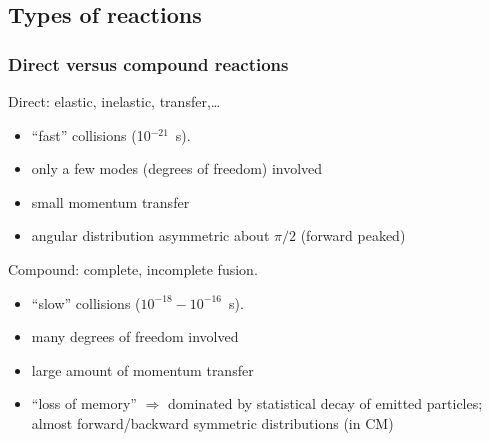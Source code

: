 \documentclass[english,10pt]{beamer}
\newcommand{\slide}[1]{\begin{frame} \frametitle{ #1}}
\begin{document}
\subsection{Types of reactions}

\slide{Direct versus compound reactions}

{\sc \brick Direct:} elastic, inelastic, transfer,\ldots
\begin{itemize}
\setlength{\itemsep}{10pt}
\item ``fast'' collisions (10$^{-21}$~s).
\item only a few modes (degrees of freedom) involved
\item  small momentum transfer
\item angular distribution asymmetric about $\pi/2$ (forward peaked)
\end{itemize}

\vspace{0.5cm}

{\sc \brick Compound:} complete, incomplete fusion.
\begin{itemize}
\setlength{\itemsep}{10pt}
\item ``slow'' collisions ($10^{-18}-10^{-16}$~s).
\item many degrees of freedom involved
\item large amount of momentum transfer
\item ``loss of memory''  $\Rightarrow$ dominated by statistical decay of  emitted particles;  almost forward/backward symmetric distributions  (in CM)
\end{itemize}
\end{frame}
\end{document}
